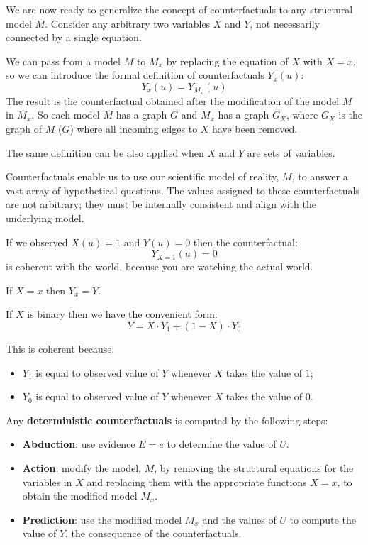 We are now ready to generalize the concept of counterfactuals to any structural
model $M$. Consider any arbitrary two variables $X$ and $Y$, not necessarily
connected by a single equation.

We can pass from a model $M$ to $M_x$ by replacing the equation of $X$ with $X = x$,
so we can introduce the formal definition of counterfactuals $Y_x (u)$:
\begin{equation}
    Y_x (u) = Y_{M_x}(u)
\end{equation}
The result is the counterfactual obtained after the modification of the model
$M$ in $M_x$. So each model $M$ has a graph $G$ and $M_x$ has a graph $G_X$, where
$G_X$ is the graph of $M$ ($G$) where all incoming edges to $X$ have been removed.

The same definition can be also applied when $X$ and $Y$ are sets of variables.

Counterfactuals enable us to use our scientific model of reality, $M$, to answer
a vast array of hypothetical questions. The values assigned to these counterfactuals
are not arbitrary; they must be internally consistent and align with the underlying model.

\begin{note}
    If we observed $X(u) = 1$ and $Y(u) = 0$ then the counterfactual:
    \begin{equation*}
        Y_{X=1}(u) = 0
    \end{equation*}
    is coherent with the world, because you are watching the actual world.
\end{note}

\begin{definition}
    If $X = x$ then $Y_x = Y$.

    If $X$ is binary then we have the convenient form:
    \begin{equation}
        Y = X \cdot Y_1 + (1 - X) \cdot Y_0
    \end{equation}
\end{definition}
This is coherent because:
\begin{itemize}
    \item $Y_1$ is equal to observed value of $Y$ whenever $X$ takes the value of $1$;
    \item $Y_0$ is equal to observed value of $Y$ whenever $X$ takes the value of $0$.
\end{itemize}

Any \textbf{deterministic counterfactuals} is computed by the following steps:
\begin{itemize}
    \item \textbf{Abduction}: use evidence $E = e$ to determine the value of $U$.
    \item \textbf{Action}: modify the model, $M$, by removing the structural
          equations for the variables in $X$ and replacing them with the appropriate
          functions $X = x$, to obtain the modified model $M_x$.
    \item \textbf{Prediction}: use the modified model $M_x$ and the values of $U$
          to compute the value of $Y$, the consequence of the counterfactuals.
\end{itemize}

